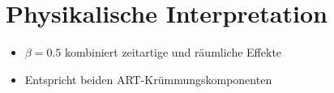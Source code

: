 \section{Physikalische Interpretation}
\begin{itemize}
    \item $\beta=0.5$ kombiniert zeitartige und räumliche Effekte
    \item Entspricht beiden ART-Krümmungskomponenten
\end{itemize}

